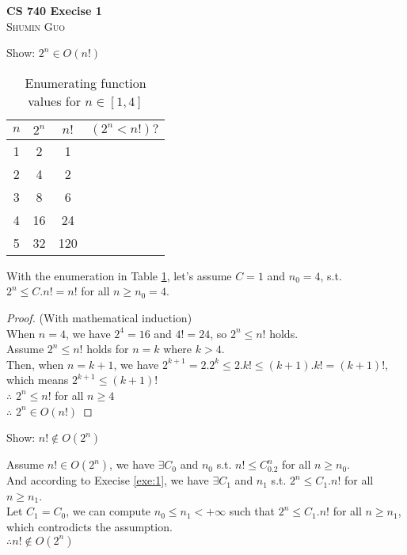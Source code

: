 \documentclass{article}
\newcommand{\tickYes}{\checkmark}
\newcommand{\tickNo}{\hspace{1pt}\ding{55}}
\begin{document}
\begin{center}
\textbf{\Huge{CS 740 Execise 1}}\\
\textsc{Shumin Guo}
\end{center}

\begin{enumerate}
\LARGE{\item Show: $2^n \in O(n!)$\label{exe:1}}
\large{
\begin{table}[ht]
  \begin{center}
    \begin{tabular}{cccc}
      \toprule $n$ & $2^n$ & $n!$ & $(2^n < n!) ?$ \\
      \midrule 1 & 2 & 1 & \tickNo \\
      \midrule 2 & 4 & 2 & \tickNo \\
      \midrule 3 & 8 & 6 & \tickNo \\
      \midrule 4 & 16 & 24 & \tickYes \\
      \midrule 5 & 32 & 120 & \tickYes \\
      \bottomrule
    \end{tabular}
    \caption{Enumerating function values for $n\in[1,4]$\label{enum}}
  \end{center}
\end{table}

With the enumeration in Table \ref{enum}, let's assume $C=1$ and
$n_0=4$, s.t. \\ $2^n \le C.n! = n!$ for all $n\ge n_0 = 4$. 

\begin{proof}
(With mathematical induction) \\
 When $n = 4$, we have $2^4 = 16$ and $4! = 24$, so $2^n\le 
n!$ holds. \\  
 Assume $2^n \le n!$ holds for $n = k$ where $k > 4$. \\
Then, when $n = k + 1$, we have $2^{k+1}=2.2^k\le 2.k!\le (k+1).k! = (k+1)!$, \\
which means $2^{k+1} \le (k+1)!$ \\
$\therefore$ $2^n \le n!$ for all $n\ge 4$\\
$\therefore$ $2^n\in O(n!)$ 
\end{proof}
}
\LARGE{\item Show: $n! \notin O(2^n)$}

\large{
  Assume $n! \in O(2^n)$, we have $\exists C_0$ and $n_0$ s.t. $n!\le C_0.2^n$
  for all $n\ge n_0$. \\ 
  And according to Execise \ref{exe:1}, we have $\exists C_1$ and $n_1$
  s.t. $2^n\le C_1.n!$ for all $n\ge n_1$.  \\
  Let $C_1 = C_0$, we can compute $n_0\le n_1$$<+\infty$ such that
  $2^n\le C_1.n!$ for all $n\ge n_1$, which controdicts the
  assumption. \\  
  $\therefore n! \notin O(2^n)$
}


\end{enumerate}
\end{document}
